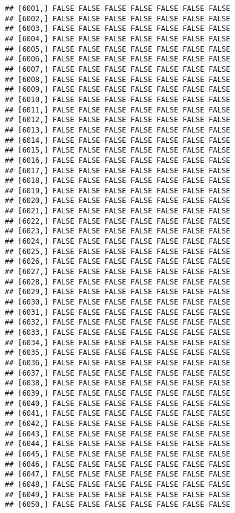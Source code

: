 \documentclass[
]{article}
\begin{document}
\begin{verbatim}
## [6001,] FALSE FALSE FALSE FALSE FALSE FALSE FALSE
## [6002,] FALSE FALSE FALSE FALSE FALSE FALSE FALSE
## [6003,] FALSE FALSE FALSE FALSE FALSE FALSE FALSE
## [6004,] FALSE FALSE FALSE FALSE FALSE FALSE FALSE
## [6005,] FALSE FALSE FALSE FALSE FALSE FALSE FALSE
## [6006,] FALSE FALSE FALSE FALSE FALSE FALSE FALSE
## [6007,] FALSE FALSE FALSE FALSE FALSE FALSE FALSE
## [6008,] FALSE FALSE FALSE FALSE FALSE FALSE FALSE
## [6009,] FALSE FALSE FALSE FALSE FALSE FALSE FALSE
## [6010,] FALSE FALSE FALSE FALSE FALSE FALSE FALSE
## [6011,] FALSE FALSE FALSE FALSE FALSE FALSE FALSE
## [6012,] FALSE FALSE FALSE FALSE FALSE FALSE FALSE
## [6013,] FALSE FALSE FALSE FALSE FALSE FALSE FALSE
## [6014,] FALSE FALSE FALSE FALSE FALSE FALSE FALSE
## [6015,] FALSE FALSE FALSE FALSE FALSE FALSE FALSE
## [6016,] FALSE FALSE FALSE FALSE FALSE FALSE FALSE
## [6017,] FALSE FALSE FALSE FALSE FALSE FALSE FALSE
## [6018,] FALSE FALSE FALSE FALSE FALSE FALSE FALSE
## [6019,] FALSE FALSE FALSE FALSE FALSE FALSE FALSE
## [6020,] FALSE FALSE FALSE FALSE FALSE FALSE FALSE
## [6021,] FALSE FALSE FALSE FALSE FALSE FALSE FALSE
## [6022,] FALSE FALSE FALSE FALSE FALSE FALSE FALSE
## [6023,] FALSE FALSE FALSE FALSE FALSE FALSE FALSE
## [6024,] FALSE FALSE FALSE FALSE FALSE FALSE FALSE
## [6025,] FALSE FALSE FALSE FALSE FALSE FALSE FALSE
## [6026,] FALSE FALSE FALSE FALSE FALSE FALSE FALSE
## [6027,] FALSE FALSE FALSE FALSE FALSE FALSE FALSE
## [6028,] FALSE FALSE FALSE FALSE FALSE FALSE FALSE
## [6029,] FALSE FALSE FALSE FALSE FALSE FALSE FALSE
## [6030,] FALSE FALSE FALSE FALSE FALSE FALSE FALSE
## [6031,] FALSE FALSE FALSE FALSE FALSE FALSE FALSE
## [6032,] FALSE FALSE FALSE FALSE FALSE FALSE FALSE
## [6033,] FALSE FALSE FALSE FALSE FALSE FALSE FALSE
## [6034,] FALSE FALSE FALSE FALSE FALSE FALSE FALSE
## [6035,] FALSE FALSE FALSE FALSE FALSE FALSE FALSE
## [6036,] FALSE FALSE FALSE FALSE FALSE FALSE FALSE
## [6037,] FALSE FALSE FALSE FALSE FALSE FALSE FALSE
## [6038,] FALSE FALSE FALSE FALSE FALSE FALSE FALSE
## [6039,] FALSE FALSE FALSE FALSE FALSE FALSE FALSE
## [6040,] FALSE FALSE FALSE FALSE FALSE FALSE FALSE
## [6041,] FALSE FALSE FALSE FALSE FALSE FALSE FALSE
## [6042,] FALSE FALSE FALSE FALSE FALSE FALSE FALSE
## [6043,] FALSE FALSE FALSE FALSE FALSE FALSE FALSE
## [6044,] FALSE FALSE FALSE FALSE FALSE FALSE FALSE
## [6045,] FALSE FALSE FALSE FALSE FALSE FALSE FALSE
## [6046,] FALSE FALSE FALSE FALSE FALSE FALSE FALSE
## [6047,] FALSE FALSE FALSE FALSE FALSE FALSE FALSE
## [6048,] FALSE FALSE FALSE FALSE FALSE FALSE FALSE
## [6049,] FALSE FALSE FALSE FALSE FALSE FALSE FALSE
## [6050,] FALSE FALSE FALSE FALSE FALSE FALSE FALSE

\end{verbatim}
\end{document}
